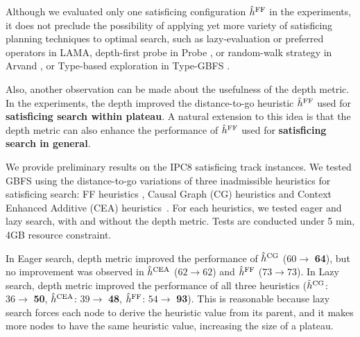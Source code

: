 Although we evaluated only one \sota satisficing configuration $\hat{h}^{\text{FF}}$ in
the experiments, it does not preclude the possibility of applying yet
more variety of satisficing planning techniques to optimal search, such as lazy-evaluation
or preferred operators in LAMA, depth-first probe in Probe \cite{LipovetzkyG11}, or
random-walk strategy in Arvand \cite{nakhost2009monte}, or Type-based
exploration in Type-GBFS \cite{xie14type}.

Also, another observation can be made about the usefulness of the depth metric.
In the experiments, the depth improved the distance-to-go \ff heuristic $\hat{h}^{\text{FF}}$
used for \textbf{satisficing search within plateau}. A natural extension
to this idea is that the depth metric can also enhance the performance of
$\hat{h}^{\text{FF}}$ used for \textbf{satisficing search in general}.

We provide preliminary results on the IPC8 satisficing track
instances. We tested GBFS using the distance-to-go variations of three
\sota inadmissible heuristics for satisficing search: FF heuristics
 \cite{Hoffmann01}, Causal Graph (CG) heuristics \cite{Helmert2006} and
Context Enhanced Additive (CEA) heuristics\ \cite{helmert2008unifying}.
For each heuristics, we tested eager and lazy search, with and without
the depth metric.  Tests are conducted under 5 min, 4GB
resource constraint.

In Eager search, depth metric
improved the performance of $\hat{h}^{\text{CG}}$ ($60\rightarrow $ \textbf{64}), but no
improvement was observed in $\hat{h}^{\text{CEA}}$ ($62\rightarrow 62$)
and $\hat{h}^{\text{FF}}$ ($73\rightarrow 73$). In Lazy search, depth metric
improved the performance of all three heuristics
($\hat{h}^{\text{CG}}$: $36\rightarrow $ \textbf{50}, 
 $\hat{h}^{\text{CEA}}$: $39\rightarrow $ \textbf{48}, 
 $\hat{h}^{\text{FF}}$: $54\rightarrow $ \textbf{93}). This is reasonable
because lazy search forces each node to derive the heuristic value from
its parent, and it makes more nodes to have the same heuristic value,
increasing the size of a plateau.

%  

